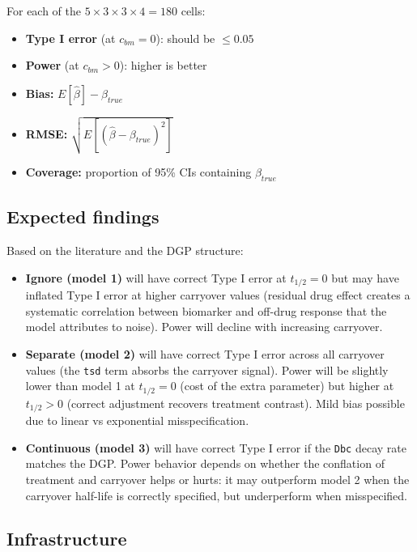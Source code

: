 \documentclass[11pt]{article}
\begin{document}
For each of the $5 \times 3 \times 3 \times 4 = 180$ cells:

\begin{itemize}
  \item \textbf{Type I error} (at $c_{bm} = 0$): should be $\leq 0.05$
  \item \textbf{Power} (at $c_{bm} > 0$): higher is better
  \item \textbf{Bias:} $E[\hat{\beta}] - \beta_{true}$
  \item \textbf{RMSE:} $\sqrt{E[(\hat{\beta} - \beta_{true})^2]}$
  \item \textbf{Coverage:} proportion of 95\% CIs containing $\beta_{true}$
\end{itemize}

\subsection{Expected findings}

Based on the literature and the DGP structure:

\begin{itemize}
  \item \textbf{Ignore (model 1)} will have correct Type I error at
    $t_{1/2} = 0$ but may have inflated Type I error at higher
    carryover values (residual drug effect creates a systematic
    correlation between biomarker and off-drug response that the
    model attributes to noise). Power will decline with increasing
    carryover.

  \item \textbf{Separate (model 2)} will have correct Type I error across
    all carryover values (the \texttt{tsd} term absorbs the carryover
    signal). Power will be slightly lower than model 1 at
    $t_{1/2} = 0$ (cost of the extra parameter) but higher at
    $t_{1/2} > 0$ (correct adjustment recovers treatment
    contrast). Mild bias possible due to linear vs exponential
    misspecification.

  \item \textbf{Continuous (model 3)} will have correct Type I error if the
    \texttt{Dbc} decay rate matches the DGP. Power behavior depends on
    whether the conflation of treatment and carryover helps or
    hurts: it may outperform model 2 when the carryover half-life
    is correctly specified, but underperform when misspecified.
\end{itemize}

\subsection{Infrastructure}
\end{document}
